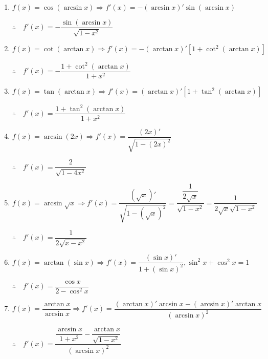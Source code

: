 \documentclass[a4paper,12pt]{article}
\begin{document}
\begin{enumerate}
	\item $f(x)=\cos (\arcsin x)\Longrightarrow f'(x)=-(\arcsin x)'\sin (\arcsin x)$
	      \begin{center}
		      $\therefore \quad f'(x)=-\dfrac{\sin (\arcsin x)}{\sqrt{1-x^2}}$
	      \end{center}
	\item $f(x)=\cot (\arctan x)\Longrightarrow f'(x)=-(\arctan x)'[1+\cot^2 (\arctan x)]$
	      \begin{center}
		      $\therefore \quad f'(x)=-\dfrac{1+\cot^2 (\arctan x)}{1+x^2}$
	      \end{center}
	\item $f(x)=\tan (\arctan x)\Longrightarrow f'(x)=(\arctan x)'[1+\tan^2 (\arctan x)]$
	      \begin{center}
		      $\therefore \quad f'(x)=\dfrac{1+\tan^2 (\arctan x)}{1+x^2}$
	      \end{center}
	\item $f(x)=\arcsin (2x)\Longrightarrow f'(x)=\dfrac{(2x)'}{\sqrt{1-(2x)^2}}$
	      \begin{center}
		      $\therefore \quad f'(x)=\dfrac{2}{\sqrt{1-4x^2}}$
	      \end{center}
	\item $f(x)=\arcsin \sqrt{x}\Longrightarrow f'(x)=\dfrac{(\sqrt{x})'}{\sqrt{1-(\sqrt{x})^2}}=\dfrac{\dfrac{1}{2\sqrt{x}}}{\sqrt{1-x^2}}=\dfrac{1}{2\sqrt{x}\sqrt{1-x^2}}$
	      \begin{center}
		      $\therefore \quad f'(x)=\dfrac{1}{2\sqrt{x-x^2}}$
	      \end{center}
	\item $f(x)=\arctan (\sin x)\Longrightarrow f'(x)=\dfrac{(\sin x)'}{1+(\sin x)^2},\sin^2 x+\cos^2 x=1$
	      \begin{center}
		      $\therefore \quad f'(x)=\dfrac{\cos x}{2-\cos^2 x}$
	      \end{center}
	\item $f(x)=\dfrac{\arctan x}{\arcsin x}\Longrightarrow f'(x)=\dfrac{(\arctan x)'\arcsin x-(\arcsin x)'\arctan x}{(\arcsin x)^2}$
	      \begin{center}
		      $\therefore \quad f'(x)=\dfrac{\dfrac{\arcsin x}{1+x^2}-\dfrac{\arctan x}{\sqrt{1-x^2}}}{(\arcsin x)^2}$
	      \end{center}
\end{enumerate}

\newpage
\end{document}
